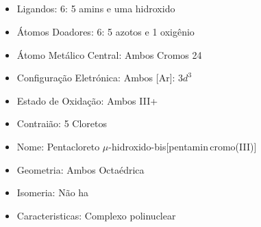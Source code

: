 \documentclass[12pt]{article}
\begin{document}
	\subsection{}
	\begin{itemize}
   
   
   \item Ligandos: 6:
   	5 amins  e uma hidroxido 
   
   \item Átomos Doadores: 6:
   	5 azotos e
		1 oxigênio
   
      
   \item Átomo Metálico Central: Ambos Cromos 24
   
   \item Configuração Eletrónica: Ambos [Ar]: $ 3d^3 $
   
   \item Estado de Oxidação: Ambos III+
   
   \item Contraião: 5 Cloretos 
   
   \item Nome:
   	Pentacloreto $\mu$-hidroxido-bis[pentamin\,cromo(III)]
   
   \item Geometria: Ambos Octaédrica
   
   \item Isomeria: Não ha

	\item Caracteristicas: Complexo polinuclear

	\end{itemize}
	
\break

	
\end{document}
